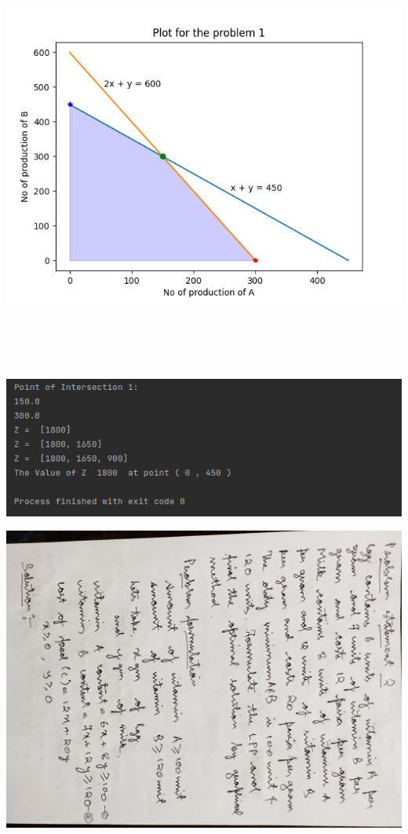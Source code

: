 \documentclass{article}
\begin{document}
\begin{center}
\includegraphics[height=400pt]{Plot1}
\end{center}
\begin{flushleft}
\includegraphics[width=\paperwidth]{Output1}
\end{flushleft}
\includegraphics[width=\paperheight, height=\paperwidth, angle=90]{Page6}
\end{document}
